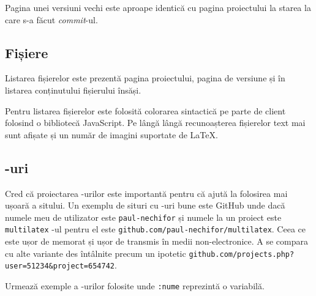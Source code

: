 \documentclass[a4wide,12pt]{report}
\newcommand{\eng}[1]{\emph{#1}} %
\newcommand{\cod}[1]{\texttt{#1}}
\newcommand{\acr}[1]{{\textsmaller[1]{\textsc{#1}}}} %
\begin{document}
Pagina unei versiuni vechi este aproape identică cu pagina proiectului la
starea la care s-a făcut \eng{commit}-ul.

\subsection{Fișiere}

Listarea fișierelor este prezentă pagina proiectului, pagina de versiune și
în listarea conținutului fișierului însăși.

Pentru listarea fișierelor este folosită colorarea sintactică pe parte de client
folosind o bibliotecă JavaScript. Pe lângă lângă recunoașterea fișierelor text mai
sunt afișate și un număr de imagini suportate de \LaTeX{}.

\subsection{\acr{URL}-uri}

Cred că proiectarea \acr{URL}-urilor este importantă pentru că ajută la
folosirea mai ușoară a sitului. Un exemplu de situri cu \acr{URL}-uri bune este
GitHub unde dacă numele meu de utilizator este \cod{paul-nechifor} și numele la
un proiect este \cod{multilatex} \acr{URL}-ul pentru el este
\cod{github.com/paul-nechifor/multilatex}. Ceea ce este ușor de memorat și ușor
de transmis în medii non-electronice. A se compara cu alte variante des
întâlnite precum un ipotetic
\cod{github.com/projects.php?user=51234\&project=654742}.

Urmează exemple a \acr{URL}-urilor folosite unde \cod{:nume} reprezintă o
variabilă.
\end{document}
